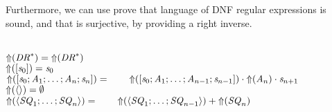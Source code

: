 Furthermore, we can use prove that language of DNF regular expressions is sound,
and that \ToDNFRegex{} is surjective, by providing a right inverse.

\begin{definition}\leavevmode\\
$\mathit{\Uparrow}(\mathit{DR}^*) = \mathit{\Uparrow}(\mathit{DR}^*)$\\
$\mathit{\Uparrow}([\mathit{s}_0]) = \mathit{s}_0$\\
$\mathit{\Uparrow}([\mathit{s}_0;\mathit{A}_1;\ldots
;\mathit{A}_n;\mathit{s}_n]) =\\
\hspace*{2em}\mathit{\Uparrow}([\mathit{s}_0;\mathit{A}_1;
\ldots;\mathit{A}_{n-1};\mathit{s}_{n-1}])
\cdot \mathit{\Uparrow}(\mathit{A}_n) \cdot \mathit{s}_{n+1}$\\
$\mathit{\Uparrow}(\langle\rangle)=\emptyset$\\
$\mathit{\Uparrow}(\langle\mathit{SQ}_1;\ldots;\mathit{SQ}_n\rangle)=\\
\hspace*{2em}\mathit{\Uparrow}(\langle\mathit{SQ}_1;\ldots;\mathit{SQ}_{n-1}\rangle)
+ \mathit{\Uparrow}(\mathit{SQ}_n)$
\end{definition}

